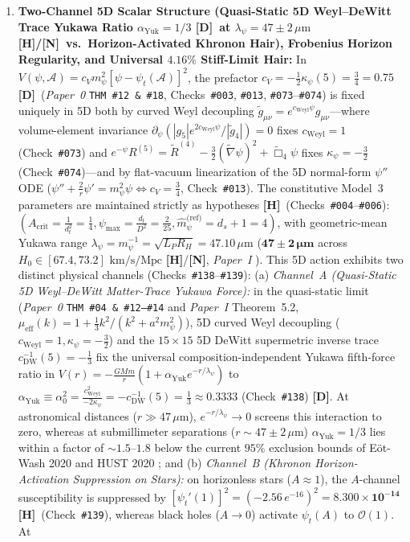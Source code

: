 \documentclass[11pt,a4paper]{article}
\newcommand{\catD}{\textbf{\textcolor{blue!75!black}{[D]}}}
\newcommand{\catH}{\textbf{\textcolor{orange!85!black}{[H]}}}
\newcommand{\catN}{\textbf{\textcolor{teal!75!black}{[N]}}}
\theoremstyle{plain}
\theoremstyle{definition}
\theoremstyle{remark}
\numberwithin{equation}{section}
\begin{document}
\begin{enumerate}
    \item \textbf{Two-Channel 5D Scalar Structure (Quasi-Static 5D Weyl--DeWitt Trace Yukawa Ratio $\alpha_{\text{Yuk}} = 1/3$ \catD\ at $\lambda_{\psi} = 47 \pm 2\,\mu\text{m}$ \catH/\catN\ vs.\ Horizon-Activated Khronon Hair), Frobenius Horizon Regularity, and Universal $4.16\%$ Stiff-Limit Hair:} In $V(\psi,\mathcal{A}) = c_V m_{\psi}^2[\psi - \psi_t(\mathcal{A})]^2$, the prefactor $c_V = -\frac{1}{2}\kappa_{\psi}(5) = \frac{3}{4} = 0.75$ \catD\ (\textit{Paper~0} \texttt{THM~\#12 \& \#18}, Checks~\texttt{\#003}, \texttt{\#013}, \texttt{\#073}--\texttt{\#074}) is fixed uniquely in 5D both by curved Weyl decoupling $\tilde{g}_{\mu\nu} = e^{c_{\text{Weyl}}\psi}g_{\mu\nu}$---where volume-element invariance $\partial_{\psi}(|g_5|e^{2c_{\text{Weyl}}\psi}/|\tilde{g}_4|) = 0$ fixes $c_{\text{Weyl}} = 1$ (Check~\texttt{\#073}) and $e^{-\psi}R^{(5)} = \tilde{R}^{(4)} - \frac{3}{2}(\tilde{\nabla}\psi)^2 + \tilde{\Box}_4\psi$ fixes $\kappa_{\psi} = -\frac{3}{2}$ (Check~\texttt{\#074})---and by flat-vacuum linearization of the 5D normal-form $\psi''$ ODE ($\psi'' + \frac{2}{r}\psi' = m_{\psi}^2\psi \iff c_V = \frac{3}{4}$, Check~\texttt{\#013}). The constitutive Model~3 parameters are maintained strictly as hypotheses \catH\ (Checks~\texttt{\#004}--\texttt{\#006}): $(A_{\text{crit}} = \frac{1}{d_t^2} = \frac{1}{4}, \psi_{\max} = \frac{d_t}{D^2} = \frac{2}{25}, \hat{m}_{\psi}^{\text{(ref)}} = d_s + 1 = 4)$, with geometric-mean Yukawa range $\lambda_{\psi} = m_{\psi}^{-1} = \sqrt{L_P R_H} = 47.10\,\mu\text{m}$ ($\mathbf{47 \pm 2\,\mu\text{m}}$ across $H_0 \in [67.4, 73.2]\text{ km/s/Mpc}$ \catH/\catN, \textit{Paper~I} \cite{jimenez2026a}). This 5D action exhibits two distinct physical channels (Checks~\texttt{\#138}--\texttt{\#139}): (a) \textit{Channel~A (Quasi-Static 5D Weyl--DeWitt Matter-Trace Yukawa Force):} in the quasi-static limit (\textit{Paper~0} \texttt{THM~\#04 \& \#12--\#14} \cite{jimenez2026_p0} and \textit{Paper~I} Theorem~5.2, $\mu_{\text{eff}}(k) = 1 + \frac{1}{3}k^2/(k^2 + a^2 m_{\psi}^2)$), 5D curved Weyl decoupling ($c_{\text{Weyl}} = 1, \kappa_{\psi} = -\frac{3}{2}$) and the $15\times 15$ 5D DeWitt supermetric inverse trace $c_{\text{DW}}^{-1}(5) = -\frac{1}{3}$ fix the universal composition-independent Yukawa fifth-force ratio in $V(r) = -\frac{GMm}{r}(1 + \alpha_{\text{Yuk}}e^{-r/\lambda_{\psi}})$ to $\alpha_{\text{Yuk}} \equiv \alpha_0^2 = \frac{c_{\text{Weyl}}^2}{-2\kappa_{\psi}} = -c_{\text{DW}}^{-1}(5) = \frac{1}{3} \approx \mathbf{0.3333}$ (Check~\texttt{\#138}) \catD. At astronomical distances ($r \gg 47\,\mu\text{m}$), $e^{-r/\lambda_{\psi}} \to 0$ screens this interaction to zero, whereas at submillimeter separations ($r \sim 47 \pm 2\,\mu\text{m}$) $\alpha_{\text{Yuk}} = 1/3$ lies within a factor of $\sim 1.5\text{--}1.8$ below the current $95\%$ exclusion bounds of E\"ot-Wash 2020 \cite{lee2020_eotwash} and HUST 2020 \cite{tan2020_hust}; and (b) \textit{Channel~B (Khronon Horizon-Activation Suppression on Stars):} on horizonless stars ($A \approx 1$), the $A$-channel susceptibility is suppressed by $[\psi_t'(1)]^2 = (-2.56\,e^{-16})^2 = \mathbf{8.300 \times 10^{-14}}$ \catH\ (Check~\texttt{\#139}), whereas black holes ($A \to 0$) activate $\psi_t(A)$ to $\mathcal{O}(1)$. At 
\end{enumerate}
\end{document}
